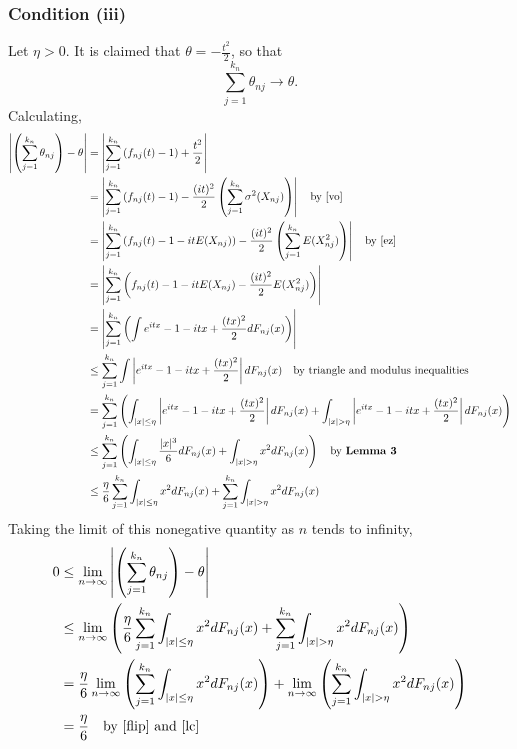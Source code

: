 \documentclass[letterpaper, 12pt]{article}
\begin{document}
\subsubsection*{Condition (iii)}
Let $\eta >0$.
It is claimed that $\theta = -\frac{t^2}{2}$, so that 
\[
\sum_{j=1}^{k_n} \theta_{nj} \to \theta.
\]
Calculating,
\begin{align*}
\left|
\left(
\sum_{j=1}^{k_n} \theta_{nj} 
\right)
- \theta
\right|
&=
\left|
\sum_{j=1}^{k_n} 
\left(
f_{nj}(t) 
- 1 
\right)
+ \frac{t^2}{2}
\right|
\\
&=
\left|
\sum_{j=1}^{k_n} 
\left(
f_{nj}(t) 
- 1
\right)
- 
\frac{(it)^2}{2}
\left(\sum_{j=1}^{k_n} \sigma^2(X_{nj})\right)
\right|
\quad
\text{by \eqref{vo}}
\\
&=
\left|
\sum_{j=1}^{k_n} 
\left(
f_{nj}(t) 
- 1 -it E(X_{nj})
\right)
-
\frac{(it)^2}{2}
\left(\sum_{j=1}^{k_n} E(X_{nj}^2)\right)
\right|
\quad
\text{by \eqref{ez}}
\\
&=
\left|
\sum_{j=1}^{k_n} 
\left(
f_{nj}(t) 
- 1 
-
it E(X_{nj})
-
\frac{(it)^2}{2}E(X_{nj}^2)
\right)
\right|
\\
&=
\left|
\sum_{j=1}^{k_n} 
\left(
\int
e^{itx}
-1
-itx
+\frac{(tx)^2}{2}
dF_{nj}(x)
\right)
\right|
\\
&\leq
\sum_{j=1}^{k_n} 
\int
\left|
e^{itx}
-1
-itx
+\frac{(tx)^2}{2}
\right|
dF_{nj}(x)
\quad
\text{by triangle and modulus inequalities}
\\
&=
\sum_{j=1}^{k_n} 
\left(
\int_{|x| \leq \eta}
\left|
e^{itx}
-1
-itx
+\frac{(tx)^2}{2}
\right|
dF_{nj}(x)
+
\int_{|x| > \eta}
\left|
e^{itx}
-1
-itx
+\frac{(tx)^2}{2}
\right|
dF_{nj}(x)
\right)
\\
&\leq
\sum_{j=1}^{k_n} 
\left(
\int_{|x| \leq \eta}
\frac{|x|^3}{6}
dF_{nj}(x)
+
\int_{|x| > \eta}
x^2
dF_{nj}(x)
\right)
\quad
\text{by \textbf{Lemma 3}}
\\
&\leq
\frac{\eta}{6}
\sum_{j=1}^{k_n} 
\int_{|x| \leq \eta}
x^2
dF_{nj}(x)
+
\sum_{j=1}^{k_n} 
\int_{|x| > \eta}
x^2
dF_{nj}(x)
\end{align*}
Taking the limit of this nonegative quantity as $n$ tends to infinity,
\begin{align*}
0 
&\leq
\lim_{n \to \infty}
\left|
\left(
\sum_{j=1}^{k_n} \theta_{nj} 
\right)
- \theta
\right|
\\
&\leq
\lim_{n \to \infty}
\left(
\frac{\eta}{6}
\sum_{j=1}^{k_n} 
\int_{|x| \leq \eta}
x^2
dF_{nj}(x)
+
\sum_{j=1}^{k_n} 
\int_{|x| > \eta}
x^2
dF_{nj}(x)
\right)
\\
&=
\frac{\eta}{6}
\lim_{n \to \infty}
\left(
\sum_{j=1}^{k_n} 
\int_{|x| \leq \eta}
x^2
dF_{nj}(x)
\right)
+
\lim_{n \to \infty}
\left(
\sum_{j=1}^{k_n} 
\int_{|x| > \eta}
x^2
dF_{nj}(x)
\right)
\\
&=
\frac{\eta}{6}
\quad
\text{by \eqref{flip} and \eqref{lc}}
\end{align*}
\end{document}
